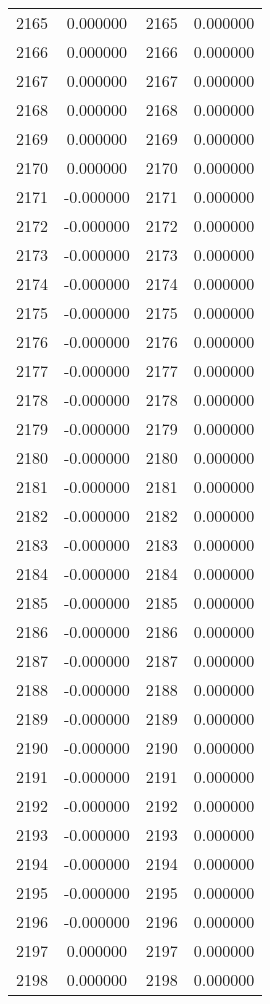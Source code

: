 \documentclass[12pt]{article}
\begin{document}
\begin{longtable}{@{}cccc@{}}
2165 & 0.000000 & 2165 & 0.000000 \\
2166 & 0.000000 & 2166 & 0.000000 \\
2167 & 0.000000 & 2167 & 0.000000 \\
2168 & 0.000000 & 2168 & 0.000000 \\
2169 & 0.000000 & 2169 & 0.000000 \\
2170 & 0.000000 & 2170 & 0.000000 \\
2171 & -0.000000 & 2171 & 0.000000 \\
2172 & -0.000000 & 2172 & 0.000000 \\
2173 & -0.000000 & 2173 & 0.000000 \\
2174 & -0.000000 & 2174 & 0.000000 \\
2175 & -0.000000 & 2175 & 0.000000 \\
2176 & -0.000000 & 2176 & 0.000000 \\
2177 & -0.000000 & 2177 & 0.000000 \\
2178 & -0.000000 & 2178 & 0.000000 \\
2179 & -0.000000 & 2179 & 0.000000 \\
2180 & -0.000000 & 2180 & 0.000000 \\
2181 & -0.000000 & 2181 & 0.000000 \\
2182 & -0.000000 & 2182 & 0.000000 \\
2183 & -0.000000 & 2183 & 0.000000 \\
2184 & -0.000000 & 2184 & 0.000000 \\
2185 & -0.000000 & 2185 & 0.000000 \\
2186 & -0.000000 & 2186 & 0.000000 \\
2187 & -0.000000 & 2187 & 0.000000 \\
2188 & -0.000000 & 2188 & 0.000000 \\
2189 & -0.000000 & 2189 & 0.000000 \\
2190 & -0.000000 & 2190 & 0.000000 \\
2191 & -0.000000 & 2191 & 0.000000 \\
2192 & -0.000000 & 2192 & 0.000000 \\
2193 & -0.000000 & 2193 & 0.000000 \\
2194 & -0.000000 & 2194 & 0.000000 \\
2195 & -0.000000 & 2195 & 0.000000 \\
2196 & -0.000000 & 2196 & 0.000000 \\
2197 & 0.000000 & 2197 & 0.000000 \\
2198 & 0.000000 & 2198 & 0.000000 \\

\end{longtable}
\end{document}
